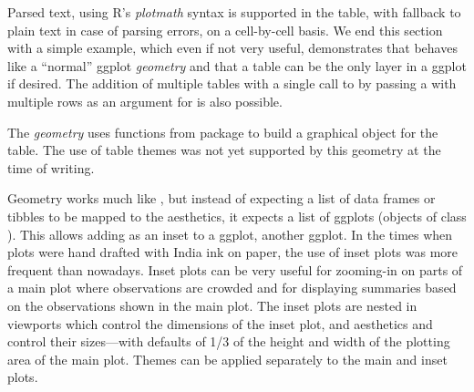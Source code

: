 \documentclass[krantz2]{krantz}\usepackage{knitr}
\begin{document}
Parsed text, using R's \emph{plotmath} syntax is supported in the table, with fallback to plain text in case of parsing errors, on a cell-by-cell basis. We end this section with a simple example, which even if not very useful, demonstrates that  behaves like a ``normal'' ggplot \emph{geometry} and that a table can be the only layer in a ggplot if desired. The addition of multiple tables with a single call to  by passing a  with multiple rows as an argument for  is also possible.

\begin{knitrout}\footnotesize
{}\color{fgcolor}\begin{kframe}
\begin{alltt}
 \hlkwb{<-} \hlstd{(} \hlstd{=} \hlstd{,}
                 \hlstd{=} \hlopt{:}\hlstd{,}
                 \hlstd{= (}\hlopt{:}\hlstd{)}\hlopt{^}\hlstd{,}
                 \hlstd{= (}\hlopt{:}\hlstd{)}\hlopt{^}\hlstd{)}
 \hlkwb{<-} \hlstd{(} \hlstd{=} \hlstd{,}  \hlstd{=} \hlstd{,}  \hlstd{=} 
  \hlstd{=}    \hlopt{+}
  \hlstd{(} \hlstd{=} \hlstd{,}  \hlstd{=} \hlstd{,}  \hlstd{=} \hlstd{)} \hlopt{+}
  \hlstd{()}
\end{alltt}
\end{kframe}
\end{knitrout}

\begin{explainbox}
  The \emph{geometry}  uses functions from package  to build a graphical object for the table. The use of table themes was not yet supported by this geometry at the time of writing.
\end{explainbox}

Geometry  works much like , but instead of expecting a list of data frames or tibbles to be mapped to the  aesthetics, it expects a list of ggplots (objects of class ). This allows adding as an inset to a ggplot, another ggplot. In the times when plots were hand drafted with India ink on paper, the use of inset plots was more frequent than nowadays. Inset plots can be very useful for zooming-in on parts of a main plot where observations are crowded and for displaying summaries based on the observations shown in the main plot. The inset plots are nested in viewports which control the dimensions of the inset plot, and aesthetics  and  control their sizes---with defaults of 1/3 of the height and width of the plotting area of the main plot. Themes can be applied separately to the main and inset plots.
\end{document}
